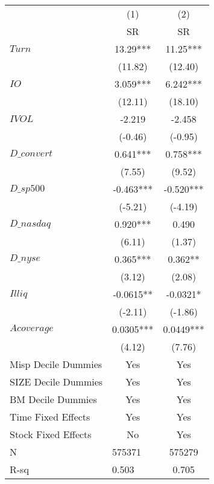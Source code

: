 \begin{tabular}{llc}
\toprule
        & \multicolumn{1}{c}{(1)} & (2) \\
        & \multicolumn{1}{c}{SR} & SR \\
\midrule
$Turn$  & \multicolumn{1}{c}{13.29***} & 11.25*** \\
        & \multicolumn{1}{c}{(11.82)} & (12.40) \\
$IO$    & \multicolumn{1}{c}{3.059***} & 6.242*** \\
        & \multicolumn{1}{c}{(12.11)} & (18.10) \\
$IVOL$  & \multicolumn{1}{c}{-2.219} & -2.458 \\
        & \multicolumn{1}{c}{(-0.46)} & (-0.95) \\
$D\_convert$ & \multicolumn{1}{c}{0.641***} & 0.758*** \\
        & \multicolumn{1}{c}{(7.55)} & (9.52) \\
$D\_sp500$ & \multicolumn{1}{c}{-0.463***} & -0.520*** \\
        & \multicolumn{1}{c}{(-5.21)} & (-4.19) \\
$D\_nasdaq$ & \multicolumn{1}{c}{0.920***} & 0.490 \\
        & \multicolumn{1}{c}{(6.11)} & (1.37) \\
$D\_nyse$ & \multicolumn{1}{c}{0.365***} & 0.362** \\
        & \multicolumn{1}{c}{(3.12)} & (2.08) \\
$Illiq$ & \multicolumn{1}{c}{-0.0615**} & -0.0321* \\
        & \multicolumn{1}{c}{(-2.11)} & (-1.86) \\
$Acoverage$ & \multicolumn{1}{c}{0.0305***} & 0.0449*** \\
        & \multicolumn{1}{c}{(4.12)} & (7.76) \\
\midrule
Misp Decile Dummies & \multicolumn{1}{c}{Yes} & Yes \\
SIZE Decile Dummies & \multicolumn{1}{c}{Yes} & Yes \\
BM Decile Dummies & \multicolumn{1}{c}{Yes} & Yes \\
Time Fixed Effects & \multicolumn{1}{c}{Yes} & Yes \\
Stock Fixed Effects & \multicolumn{1}{c}{No} & Yes \\
N       & 575371  & 575279 \\
R-sq    & 0.503   & 0.705 \\
\bottomrule
\end{tabular}%

